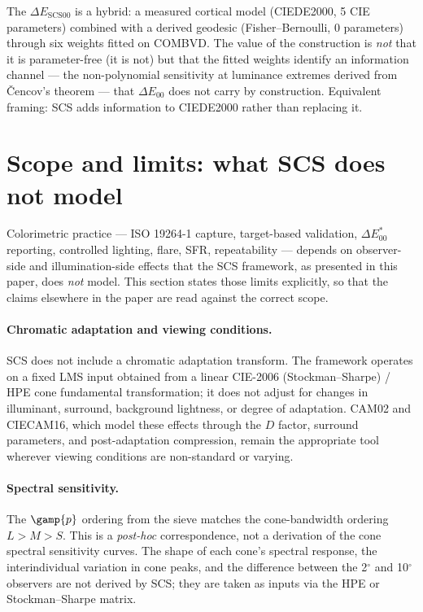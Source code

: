 \documentclass[12pt,a4paper]{article}
\begin{document}
The $\Delta E_{\mathrm{SCS00}}$ is a hybrid: a measured cortical model
(CIEDE2000, 5 CIE parameters) combined with a derived geodesic
(Fisher--Bernoulli, 0 parameters) through six weights fitted on COMBVD.
The value of the construction is \emph{not} that it is parameter-free
(it is not) but that the fitted weights identify an information channel
--- the non-polynomial sensitivity at luminance extremes derived from
\v{C}encov's theorem --- that $\Delta E_{00}$ does not carry by
construction. Equivalent framing: SCS adds information to CIEDE2000
rather than replacing it.

\section{Scope and limits: what SCS does not model}
\label{sec:scope_limits}

Colorimetric practice --- ISO 19264-1 capture, target-based validation,
$\Delta E^*_{00}$ reporting, controlled lighting, flare, SFR,
repeatability --- depends on observer-side and illumination-side effects
that the SCS framework, as presented in this paper, does \emph{not}
model. This section states those limits explicitly, so that the claims
elsewhere in the paper are read against the correct scope.

\paragraph{Chromatic adaptation and viewing conditions.}
SCS does not include a chromatic adaptation transform. The framework
operates on a fixed LMS input obtained from a linear CIE-2006
(Stockman--Sharpe) / HPE cone fundamental transformation; it does not
adjust for changes in illuminant, surround, background lightness, or
degree of adaptation. CAM02 and CIECAM16, which model these effects
through the $D$ factor, surround parameters, and post-adaptation
compression, remain the appropriate tool wherever viewing conditions
are non-standard or varying.

\paragraph{Spectral sensitivity.}
The $\gamp{p}$ ordering from the sieve matches the cone-bandwidth
ordering $L > M > S$. This is a \emph{post-hoc} correspondence, not
a derivation of the cone spectral sensitivity curves. The shape of
each cone's spectral response, the interindividual variation in cone
peaks, and the difference between the 2$^\circ$ and 10$^\circ$ observers
are not derived by SCS; they are taken as inputs via the HPE or
Stockman--Sharpe matrix.
\end{document}
